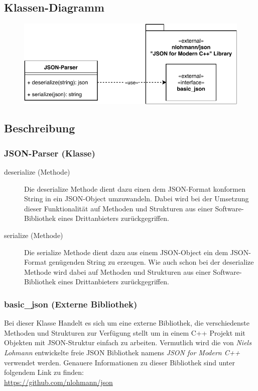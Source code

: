 \subsection{Klassen-Diagramm}
	\begin{figure}[H]
        \centering
        \includegraphics[scale=1]{images/JSON-Parser.pdf}
    \end{figure}

\subsection{Beschreibung}
	\subsubsection{JSON-Parser (Klasse)}
	
		\begin{description}
                
        	\item[deserialize (Methode)]
        	Die deserialize Methode dient dazu einen dem JSON-Format konformen String in ein JSON-Object umzuwandeln. Dabei wird bei der Umsetzung dieser Funktionalität auf Methoden und Strukturen aus einer Software-Bibliothek eines Drittanbieters zurückgegriffen. 
        	
        	\item[serialize (Methode)]
        	Die serialize Methode dient dazu aus einem JSON-Object ein dem JSON-Format genügenden String zu erzeugen. Wie auch schon bei der deserialize Methode wird dabei auf Methoden und Strukturen aus einer Software-Bibliothek eines Drittanbieters zurückgegriffen. 

    	\end{description}
    	
    \subsubsection{basic\_json (Externe Bibliothek)}
		Bei dieser Klasse Handelt es sich um eine externe Bibliothek, die verschiedenste Methoden und Strukturen zur Verfügung stellt um in einem C++ Projekt mit Objekten mit JSON-Struktur einfach zu arbeiten. Vermutlich wird die von \textit{Niels Lohmann} entwickelte freie JSON Bibliothek namens \textit{JSON for Modern C++} verwendet werden. Genauere Informationen zu dieser Bibliothek sind unter folgendem Link zu finden: \\ \url{https://github.com/nlohmann/json}

